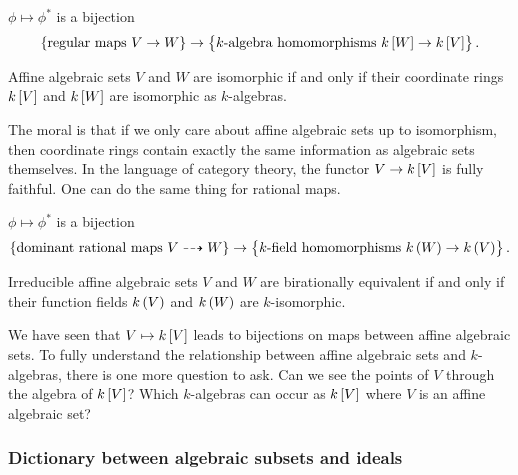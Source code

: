 \begin{proposition}
$ \phi \mapsto \phi^* $ is a bijection
$$ \cbr{\text{regular maps} \ V \to W} \to \cbr{\text{$ k $-algebra homomorphisms} \ k\sbr{W} \to k\sbr{V}}. $$
\end{proposition}

\begin{corollary}
Affine algebraic sets $ V $ and $ W $ are isomorphic if and only if their coordinate rings $ k\sbr{V} $ and $ k\sbr{W} $ are isomorphic as $ k $-algebras.
\end{corollary}

The moral is that if we only care about affine algebraic sets up to isomorphism, then coordinate rings contain exactly the same information as algebraic sets themselves. In the language of category theory, the functor $ V \to k\sbr{V} $ is fully faithful. One can do the same thing for rational maps.

\begin{proposition}
$ \phi \mapsto \phi^* $ is a bijection
$$ \cbr{\text{dominant rational maps} \ V \dashrightarrow W} \to \cbr{\text{$ k $-field homomorphisms} \ k\br{W} \to k\br{V}}. $$
\end{proposition}

\begin{corollary}
Irreducible affine algebraic sets $ V $ and $ W $ are birationally equivalent if and only if their function fields $ k\br{V} $ and $ k\br{W} $ are $ k $-isomorphic.
\end{corollary}

\pagebreak

We have seen that $ V \mapsto k\sbr{V} $ leads to bijections on maps between affine algebraic sets. To fully understand the relationship between affine algebraic sets and $ k $-algebras, there is one more question to ask. Can we see the points of $ V $ through the algebra of $ k\sbr{V} $? Which $ k $-algebras can occur as $ k\sbr{V} $ where $ V $ is an affine algebraic set?

\subsubsection{Dictionary between algebraic subsets and ideals}

